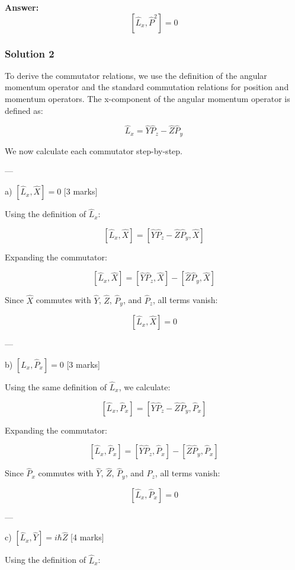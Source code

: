 \documentclass{article}
\begin{document}
\textbf{Answer:}
\[
\left[\hat{L}_x, \hat{P}^2\right] = 0
\]


\subsubsection{Solution 2}
To derive the commutator relations, we use the definition of the angular momentum operator and the standard commutation relations for position and momentum operators. The x-component of the angular momentum operator is defined as:

\[
\hat{L}_x = \hat{Y} \hat{P}_z - \hat{Z} \hat{P}_y
\]

We now calculate each commutator step-by-step.

---

a) \(\left[\hat{L}_x, \hat{X}\right] = 0\) [3 marks]  

Using the definition of \(\hat{L}_x\):

\[
\left[\hat{L}_x, \hat{X}\right] = \left[\hat{Y}\hat{P}_z - \hat{Z}\hat{P}_y, \hat{X}\right]
\]

Expanding the commutator:

\[
\left[\hat{L}_x, \hat{X}\right] = \left[\hat{Y}\hat{P}_z, \hat{X}\right] - \left[\hat{Z}\hat{P}_y, \hat{X}\right]
\]

Since \(\hat{X}\) commutes with \(\hat{Y}\), \(\hat{Z}\), \(\hat{P}_y\), and \(\hat{P}_z\), all terms vanish:

\[
\left[\hat{L}_x, \hat{X}\right] = 0
\]

---

b) \(\left[\hat{L}_x, \hat{P}_x\right] = 0\) [3 marks]  

Using the same definition of \(\hat{L}_x\), we calculate:

\[
\left[\hat{L}_x, \hat{P}_x\right] = \left[\hat{Y}\hat{P}_z - \hat{Z}\hat{P}_y, \hat{P}_x\right]
\]

Expanding the commutator:

\[
\left[\hat{L}_x, \hat{P}_x\right] = \left[\hat{Y}\hat{P}_z, \hat{P}_x\right] - \left[\hat{Z}\hat{P}_y, \hat{P}_x\right]
\]

Since \(\hat{P}_x\) commutes with \(\hat{Y}\), \(\hat{Z}\), \(\hat{P}_y\), and \(\hat{P}_z\), all terms vanish:

\[
\left[\hat{L}_x, \hat{P}_x\right] = 0
\]

---

c) \(\left[\hat{L}_x, \hat{Y}\right] = i\hbar \hat{Z}\) [4 marks]  

Using the definition of \(\hat{L}_x\):
\end{document}
